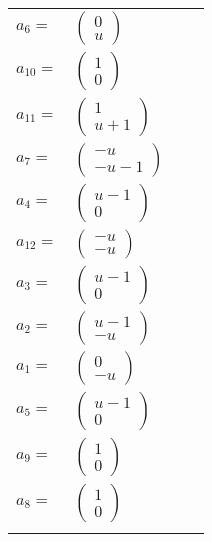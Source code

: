 \documentclass[1p]{elsarticle_modified}
\theoremstyle{definition}
\begin{document}
\begin{tabular}{m{7pt} m{180pt} m{7pt} m{180pt} }
\flushright $a_{6}=$&$\begin{pmatrix}0\\u\end{pmatrix}$ \\
\flushright $a_{10}=$&$\begin{pmatrix}1\\0\end{pmatrix}$ \\
\flushright $a_{11}=$&$\begin{pmatrix}1\\u+1\end{pmatrix}$ \\
\flushright $a_{7}=$&$\begin{pmatrix}- u\\- u-1\end{pmatrix}$ \\
\flushright $a_{4}=$&$\begin{pmatrix}u-1\\0\end{pmatrix}$ \\
\flushright $a_{12}=$&$\begin{pmatrix}- u\\- u\end{pmatrix}$ \\
\flushright $a_{3}=$&$\begin{pmatrix}u-1\\0\end{pmatrix}$ \\
\flushright $a_{2}=$&$\begin{pmatrix}u-1\\- u\end{pmatrix}$ \\
\flushright $a_{1}=$&$\begin{pmatrix}0\\- u\end{pmatrix}$ \\
\flushright $a_{5}=$&$\begin{pmatrix}u-1\\0\end{pmatrix}$ \\
\flushright $a_{9}=$&$\begin{pmatrix}1\\0\end{pmatrix}$ \\
\flushright $a_{8}=$&$\begin{pmatrix}1\\0\end{pmatrix}$\\&\end{tabular}
\end{document}
